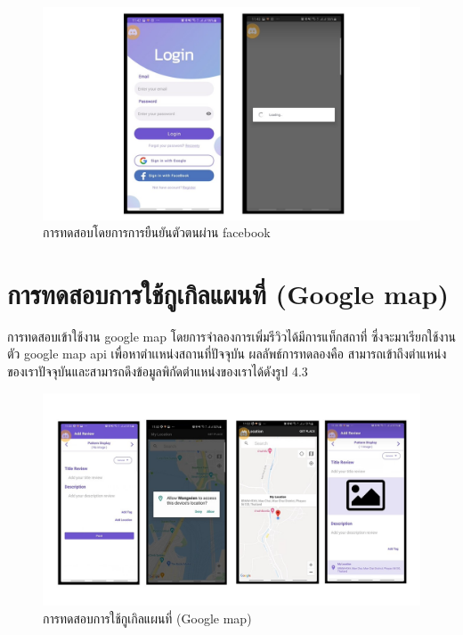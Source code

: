     \begin{figure}
    \begin{center}
      \includegraphics[width=1\textwidth]{./image/testing/Slide2.JPG}
    \end{center}
    \caption[การทดสอบโดยการการยืนยันตัวตนผ่าน facebook]{การทดสอบโดยการการยืนยันตัวตนผ่าน facebook}
    \end{figure}


\section{การทดสอบการใช้กูเกิลแผนที่ (Google map)}
\quad \quad การทดสอบเข้าใช้งาน google map โดยการจำลองการเพิ่มรีวิวได้มีการแท็กสถาที่ ซึ่งจะมาเรียกใช้งานตัว google map api เพื่อหาตำเเหน่งสถานที่ปัจจุบัน
ผลลัพธ์การทดลองคือ สามารถเข้าถึงตำแหน่งของเราปัจจุบันและสามารถดึงข้อมูลพิกัดตำแหน่งของเราได้ดังรูป 4.3
\begin{figure}
    \begin{center}
      \includegraphics[width=1\textwidth]{./image/testing/Slide3.JPG}
    \end{center}
    \caption[การทดสอบการใช้กูเกิลแผนที่]{การทดสอบการใช้กูเกิลแผนที่ (Google map)}
    \end{figure}

